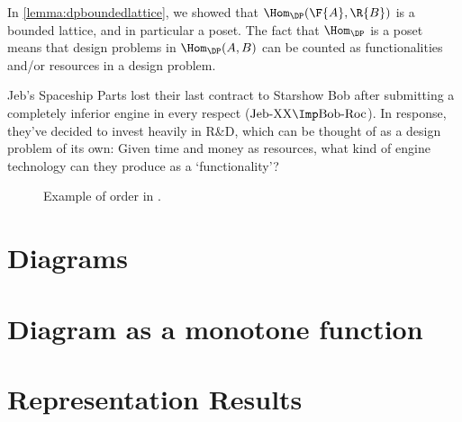 

\begin{remark}
    In \cref{lemma:dpboundedlattice}, we showed that $\Hom_{\DP}(\F{A},\R{B})$ is a bounded lattice, and in particular a poset. The fact that $\Hom_\DP$ is a poset means that design problems in $\Hom_\DP(A,B)$ can be counted as functionalities and/or resources in a design problem.
\end{remark}

\begin{example}
    \label{ex:rd}
    Jeb's Spaceship Parts lost their last contract to Starshow Bob after submitting a completely inferior engine in every respect ($\text{Jeb-XX} \Imp \text{Bob-Roc}$). In response, they've decided to invest heavily in R\&D, which can be thought of as a design problem of its own: Given time and money as resources, what kind of engine technology can they produce as a `functionality'?
\end{example}

\begin{figure}[h!]
    \begin{center}
    \end{center}
    \caption{Example of order in \DP. \label{fig:orderdp}}
\end{figure}


\section{Diagrams}\label{sec:higher-diagrams}


\section{Diagram as a monotone function}\label{sec:higher-diagram-as-function}


\section{Representation Results}\label{sec:higher-representation}
\todo{}

